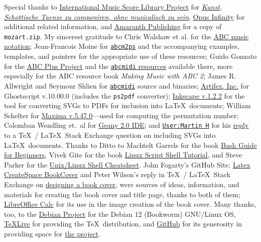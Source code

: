 \documentclass[a4paper,x11names,svgnames,10pt]{article}
\begin{document}
{Special thanks to \href{https://imslp.org}{International Music Score Library Project} for \href{https://imslp.org/wiki/Kunst\%2C\_Schottische\_Taenze\_zu\_componiren\%2C\_ohne_musicalisch\_zu\_sein\_(Gerlach\%2C\_Gustav)}{\it Kunst, Schottische Taenze zu componiren, ohne musicalisch zu sein}, \href{https://opus-infinity.org}{Opus Infinity} for additional related information, and \href{http://www.amaranthpublishing.com/MozartDiceGame.htm}{Amaranth Publishing} for a copy of {\tt mozart.zip}. My sincerest gratitude to Chris Walshaw et al. for the \href{http://www.abcnotation.com/}{ABC music notation}; Jean-Francois Moine for \href{http://moinejf.free.fr/}{\tt abcm2ps} and the accompanying examples, templates, and pointers for the appropriate use of these resources; Guido Gonzato for the \href{http://abcplus.sourceforge.net/}{ABC Plus Project} and the \href{http://abcplus.sourceforge.net/#abcMIDI}{{\tt abcmidi} resources} available there, more especially for the ABC resource book {\em Making Music with ABC 2}; James R. Allwright and Seymour Shlien for \href{http://abc.sourceforge.net/abcMIDI}{\tt abcmidi} source and binaries; \href{https://artifex.com/}{Artifex, Inc.} for Ghostscript v.10.00.0 (includes the {\tt ps2pdf} converter); \href{https://www.inkscape.org/}{Inkscape v.1.2.2} for the tool for converting SVGs to PDFs for inclusion into \LaTeX\ documents; William Schelter for \href{https://maxima.sourceforge.io}{Maxima v.5.47.0}---used for computing the permutation number; Colomban Wendling et.\ al for \href{https://www.geany.org}{Geany 2.0 IDE}; and \href{https://tex.stackexchange.com/users/632/martin-h}{\tt User:Martin H} for his \href{https://tex.stackexchange.com/questions/2099/how-to-include-svg-diagrams-in-latex}{reply} to a \TeX\ / \LaTeX\ Stack Exchange question on including SVGs into \LaTeX\ documents. Thanks to  Ditto to Machtelt Garrels for the book \href{http://tldp.org/LDP/Bash-Beginners-Guide/html/Bash-Beginners-Guide.html}{Bash Guide for Beginners}, Vivek Gite for the book \href{http://www.freeos.com/guides/lsst/}{Linux Script Shell Tutorial}, and Steve Parker for the \href{http://steve-parker.org/sh/cheatsheet.pdf}{Unix/Linux Shell Cheatsheet}. John Fogarty's GitHub Site: \href{https://github.com/jfogarty/latex-createspace-bookcover}{Latex CreateSpace BookCover} and Peter Wilson's reply in  \TeX\ / \LaTeX\ Stack Exchange on \href{https://tex.stackexchange.com/questions/17579/how-can-i-design-a-book-cover}{designing a book cover}, were sources of ideas, information, and materials for creating the book cover and title page, thanks to both of them; \href{http://www.libreoffice.org/}{LibreOffice Calc} for its use in the image creation of the book cover.  Many thanks, too, to the \href{https://www.debian.org}{Debian Project} for the Debian 12 (Bookworm) GNU/Linux OS, \href{http://www.tug.org/texlive/}{TeXLive} for providing the \TeX\ distribution,  and \href{https://github.com}{GitHub} for its generosity in providing space for \href{https://github.com/justineuro/mdgBookSVG6Kit}{the project}.  

}
\end{document}

